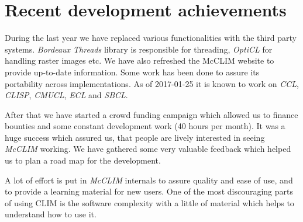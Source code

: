 \section{Recent development achievements}

During the last year we have replaced various functionalities with the
third party systems. \emph{Bordeaux Threads} library is responsible
for threading, \emph{OptiCL} for handling raster images etc. We have
also refreshed the McCLIM website to provide up-to-date
information. Some work has been done to assure its portability across
implementations. As of 2017-01-25 it is known to work on \emph{CCL},
\emph{CLISP}, \emph{CMUCL}, \emph{ECL} and \emph{SBCL}.

After that we have started a crowd funding campaign which allowed us
to finance bounties and some constant development work (40 hours per
month). It was a huge success which assured us, that people are lively
interested in seeing \emph{McCLIM} working. We have gathered some very
valuable feedback which helped us to plan a road map for the
development.

A lot of effort is put in \emph{McCLIM} internals to assure quality
and ease of use, and to provide a learning material for new users. One
of the most discouraging parts of using CLIM is the software
complexity with a little of material which helps to understand how to
use it.
